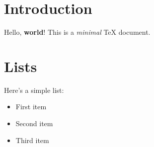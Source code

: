 \section{Introduction}

Hello, \textbf{world}! This is a \emph{minimal} TeX document.

\section{Lists}

Here’s a simple list:
\begin{itemize}
  \item First item
  \item Second item
  \item Third item
\end{itemize}
